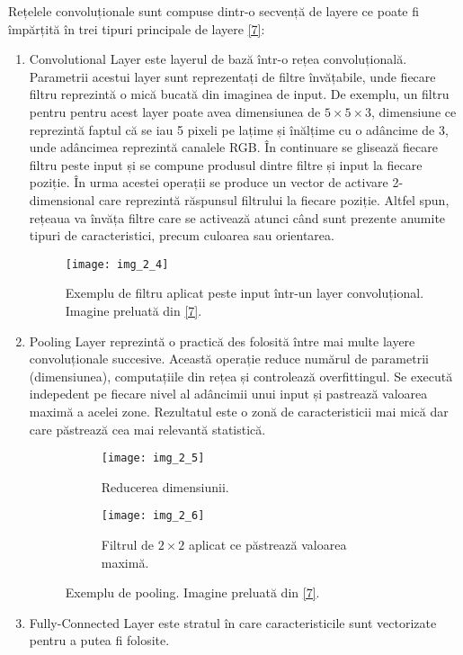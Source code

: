 Rețelele convoluționale sunt compuse dintr-o secvență de layere ce poate fi împărțită în trei tipuri principale de layere \hyperlink{cs231n}{[7]}:

\begin{enumerate}
  \item Convolutional Layer este layerul de bază într-o rețea convoluțională. Parametrii acestui layer sunt reprezentați de filtre învățabile, unde fiecare filtru reprezintă o mică bucată din imaginea de input. De exemplu, un filtru pentru pentru acest layer poate avea dimensiunea de $5\times5\times3$, dimensiune ce reprezintă faptul că se iau 5 pixeli pe lațime și înălțime cu o adâncime de 3, unde adâncimea reprezintă canalele RGB. În continuare se glisează fiecare filtru peste input și se compune produsul dintre filtre și input la fiecare poziție. În urma acestei operații se produce un vector de activare 2-dimensional care reprezintă răspunsul filtrului la fiecare poziție. Altfel spun, rețeaua va învăța filtre care se activează atunci când sunt prezente anumite tipuri de caracteristici, precum culoarea sau orientarea.

\begin{figure}[!h]
	\centering
	\texttt{[image: img\_2\_4]}
	\caption[Exemplu de filtru aplicat peste input]{Exemplu de filtru aplicat peste input într-un layer convoluțional. Imagine preluată din \hyperlink{datameetsmedia}{[7]}.}
\end{figure}   
  
  \item Pooling Layer reprezintă o practică des folosită între mai multe layere convoluționale succesive. Această operație reduce numărul de parametrii (dimensiunea), computațiile din rețea și controlează overfittingul. Se execută indepedent pe fiecare nivel al adâncimii unui input și pastrează valoarea maximă a acelei zone. Rezultatul este o zonă de caracteristicii mai mică dar care păstrează cea mai relevantă statistică.

\begin{figure}[!tbp]
  \begin{subfigure}[b]{0.4\textwidth}
    \texttt{[image: img\_2\_5]}
    \caption{Reducerea dimensiunii.}
    \label{fig:f1}
  \end{subfigure}
  \hfill
  \begin{subfigure}[b]{0.4\textwidth}
    \texttt{[image: img\_2\_6]}
    \caption{Filtrul de $2\times2$ aplicat ce păstrează valoarea maximă.}
    \label{fig:f2}
  \end{subfigure}
  \caption[Exemplu de pooling]{Exemplu de pooling. Imagine preluată din \hyperlink{datameetsmedia}{[7]}.}
\end{figure}
  
  \item Fully-Connected Layer este stratul în care caracteristicile sunt vectorizate pentru a putea fi folosite.
\end{enumerate}

